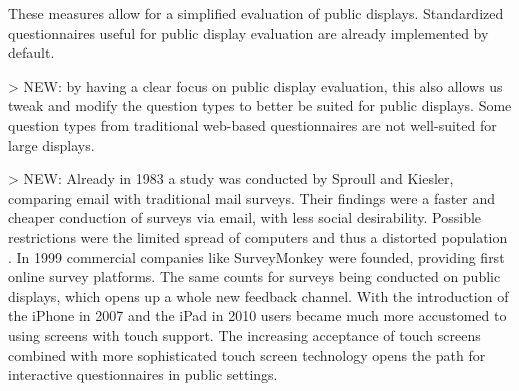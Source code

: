 	These measures allow for a simplified evaluation of public displays. Standardized questionnaires useful for public display evaluation are already implemented by default.


	> NEW: by having a clear focus on public display evaluation, this also allows us tweak and modify the question types to better be suited for public displays. Some question types from traditional web-based questionnaires are not well-suited for large displays.



	> NEW: %
	Already in 1983 a study was conducted by Sproull and Kiesler, comparing email with traditional mail surveys. Their findings were a faster and cheaper conduction of surveys via email, with less social desirability. Possible restrictions were the limited spread of computers and thus a distorted population \cite{sproull1986reducing}. In 1999 commercial companies like SurveyMonkey were founded, providing first online survey platforms. The same counts for surveys being conducted on public displays, which opens up a whole new feedback channel. With the introduction of the iPhone in 2007 and the iPad in 2010 users became much more accustomed to using screens with touch support. The increasing acceptance of touch screens combined with more sophisticated touch screen technology opens the path for interactive questionnaires in public settings. 







